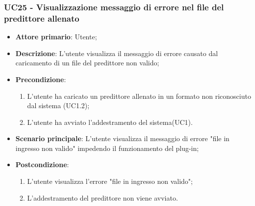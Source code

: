 \subsubsection{UC25 - Visualizzazione messaggio di errore nel file del predittore allenato}
\label{sssec:uc25}
\begin{itemize}
  \item \textbf{Attore primario}: Utente;
  \item \textbf{Descrizione}: L'utente visualizza il messaggio di errore causato dal caricamento di un file del predittore non valido;
  \item \textbf{Precondizione}:
  \begin{enumerate}
		\item L'utente ha caricato un predittore allenato in un formato non riconosciuto dal sistema (UC1.2);
		\item L'utente ha avviato l'addestramento del sistema(UC1).
	\end{enumerate}
  \item \textbf{Scenario principale}: L'utente visualizza il messaggio di errore "file in ingresso non valido" impedendo il funzionamento del plug-in;
  \item \textbf{Postcondizione}:
  \begin{enumerate}
		\item L'utente visualizza l'errore "file in ingresso non valido";
		\item L'addestramento del predittore non viene avviato.
	\end{enumerate}
\end{itemize}
